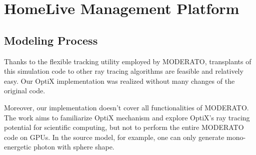 
\chapter{HomeLive Management Platform} %

\label{Chapter4} %




\section{Modeling Process}
Thanks to the flexible tracking utility employed by MODERATO, transplants of this simulation code to other ray tracing algorithms are feasible and relatively easy. Our OptiX implementation was realized without many changes of the original code.

Moreover, our implementation doesn't cover all functionalities of MODERATO. The work aims to familiarize OptiX mechanism and explore OptiX's ray tracing potential for scientific computing, but not to perform the entire MODERATO code on GPUs. In the source model, for example, one can only generate mono-energetic photon with sphere shape.

